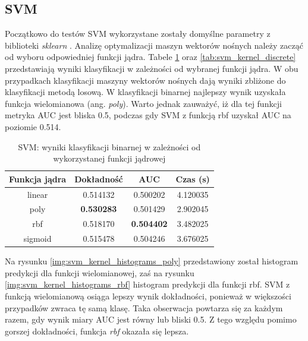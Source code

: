 \documentclass[a4paper, twoside, 11pt, openright]{article}
\begin{document}
\subsection{SVM}

Początkowo do testów SVM wykorzystane zostały domyślne parametry z biblioteki \textit{sklearn} \cite{bib:sklearnsvm}. Analizę optymalizacji maszyn wektorów nośnych należy zacząć od wyboru odpowiedniej funkcji jądra. Tabele \ref{tab:svm_kernel_binary} oraz \ref{tab:svm_kernel_discrete} przedstawiają wyniki klasyfikacji w zależności od wybranej funkcji jądra. W obu przypadkach klasyfikacji maszyny wektorów nośnych dają wyniki zbliżone do klasyfikacji metodą losową. W klasyfikacji binarnej najlepszy wynik uzyskała funkcja wielomianowa (ang. \textit{poly}). Warto jednak zauważyć, iż dla tej funkcji metryka AUC jest bliska 0.5, podczas gdy SVM z funkcją rbf uzyskał AUC na poziomie 0.514.

\begin{table}[H]
    \centering
    \begin{tabular}{|c|c|c|c|}
    \hline
        \textbf{Funkcja jądra} & \textbf{Dokładność} & \textbf{AUC} & \textbf{Czas (s)} \\ \hline
linear  &  0.514132 &  0.500202 &    4.120035 \\ \hline
poly    &  \textbf{0.530283} &  0.501429 &    2.902045 \\ \hline
rbf     &  0.518170 &  \textbf{0.504402} &    3.482025 \\ \hline
sigmoid &  0.515478 &  0.504246 &    3.676025 \\ \hline
    \end{tabular}
    \caption{SVM: wyniki klasyfikacji binarnej w zależności od wykorzystanej funkcji jądrowej}
    \label{tab:svm_kernel_binary}
\end{table}

 Na rysunku \ref{img:svm_kernel_histograms_poly} przedstawiony został histogram predykcji dla funkcji wielomianowej, zaś na rysunku \ref{img:svm_kernel_histograms_rbf} histogram predykcji dla funkcji rbf. SVM z funkcją wielomianową osiąga lepszy wynik dokładności, ponieważ w większości przypadków zwraca tę samą klasę. Taka obserwacja powtarza się za każdym razem, gdy wynik miary AUC jest równy lub bliski 0.5. Z tego względu pomimo gorszej dokładności, funkcja \textit{rbf} okazała się lepsza.
\end{document}
